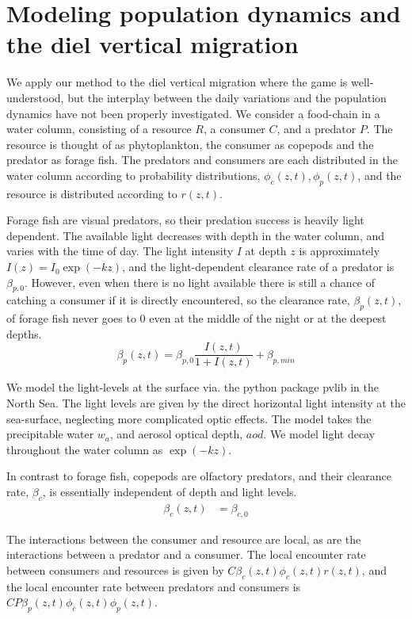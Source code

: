 
\section{Modeling population dynamics and the diel vertical migration}
We apply our method to the diel vertical migration where the game is well-understood, but the interplay between the daily variations and the population dynamics have not been properly investigated. %
We consider a food-chain in a water column, consisting of a resource $R$, a consumer $C$, and a predator $P$. The resource is thought of as phytoplankton, the consumer as copepods and the predator as forage fish. The predators and consumers are each distributed in the water column according to probability distributions, $\phi_c(z,t),\phi_p(z,t)$, and the resource is distributed according to $r(z,t)$.

Forage fish are visual predators, so their predation success is heavily light dependent. The available light decreases with depth in the water column, and varies with the time of day.
The light intensity $I$ at depth $z$ is approximately $I(z) = I_0\exp(-kz)$, and the light-dependent clearance rate of a predator is $\beta_{p,0}$.  However, even when there is no light available there is still a chance of catching a consumer if it is directly encountered,  so the clearance rate, $\beta_p(z,t)$, of forage fish never goes to 0 even at the middle of the night or at the deepest depths.
\begin{equation*}
  \beta_p(z,t) = \beta_{p,0} \frac{I(z,t)}{1+I(z,t)} + \beta_{p,min}
\end{equation*}


We model the light-levels at the surface via. the python package pvlib \citep{holmgren2018pvlib} in the North Sea. The light levels are given by the direct horizontal light intensity at the sea-surface, neglecting more complicated optic effects. The model takes the precipitable water $w_a$, and aerosol optical depth, $aod$. We model light decay throughout the water column as $\exp(-kz)$.


In contrast to forage fish, copepods are olfactory predators, and their clearance rate, $\beta_c$, is essentially independent of depth and light levels.
\begin{align*}
	\beta_c(z,t) &=  \beta_{c,0}
\end{align*}

The interactions between the consumer and resource are local, as are the interactions between a predator and a consumer. The local encounter rate between consumers and resources is given by $C\beta_c(z,t)\phi_c(z,t)r(z,t)$, and the local encounter rate between predators and consumers is $CP\beta_p(z,t)\phi_c(z,t)\phi_p(z,t)$.

